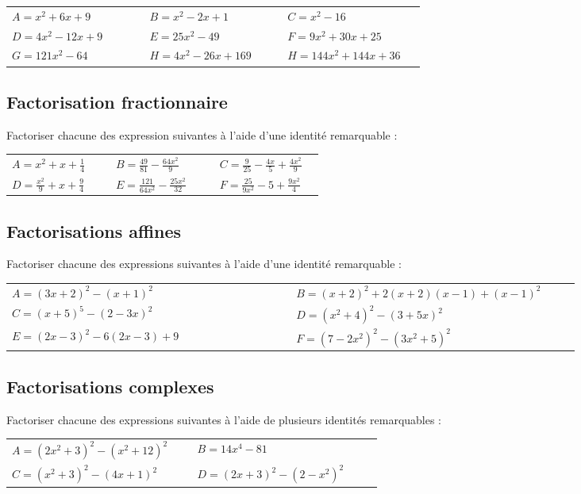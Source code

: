 \documentclass[oneside,12pt]{article}          %
\begin{document}
\begin{tabular}{p{0.3\linewidth} p{0.3\linewidth} p{0.3\linewidth}}
	$A=x^2+6x+9$ & $B=x^2-2x+1$ & $C=x^2-16$ \\
	$D=4x^2-12x+9$ & $E=25x^2-49$ & $F=9x^2+30x+25$ \\
	$G=121x^2-64$ & $H=4x^2-26x+169$ & $H=144x^2+144x+36$
\end{tabular}



\subsection{Factorisation fractionnaire}
Factoriser chacune des expression suivantes à l'aide d'une identité remarquable :

\begin{tabular}{p{0.3\linewidth} p{0.3\linewidth} p{0.3\linewidth}}
	$A=x^2+x+\frac{1}{4}$ & $B=\frac{49}{81}-\frac{64x^2}{9}$ & $C=\frac{9}{25}-\frac{4x}{5}+\frac{4x^2}{9}$ \\
	$D=\frac{x^2}{9}+x+\frac{9}{4}$ & $E=\frac{121}{64x^2}-\frac{25x^2}{32}$ & $F=\frac{25}{9x^2}-5+\frac{9x^2}{4}$
\end{tabular}



\subsection{Factorisations affines}
Factoriser chacune des expressions suivantes à l'aide d'une identité remarquable :

\begin{tabular}{p{0.45\linewidth} p{0.45\linewidth} }
	$A=(3x+2)^2-(x+1)^2$ & $B=(x+2)^2+2(x+2)(x-1)+(x-1)^2$ \\
	$C=(x+5)^5-(2-3x)^2$ & $D=(x^2+4)^2-(3+5x)^2$ \\
	$E=(2x-3)^2-6(2x-3)+9$ & $F={(7-2x^2)}^2-(3x^2+5)^2$
\end{tabular}



\subsection{Factorisations complexes}
Factoriser chacune des expressions suivantes à l'aide de plusieurs identités remarquables :

\begin{tabular}{p{0.45\linewidth} p{0.45\linewidth} }
	$A=(2x^2+3)^2-(x^2+12)^2$ & $B=14x^4-81$ \\
	$C=(x^2+3)^2-(4x+1)^2$ & $D=(2x+3)^2-(2-x^2)^2$
\end{tabular}
\end{document}
